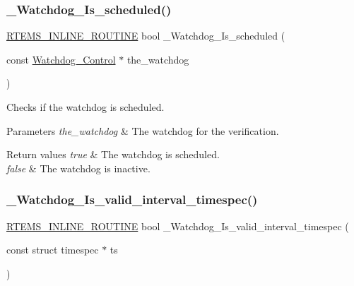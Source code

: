 \subsubsection{\texorpdfstring{\_Watchdog\_Is\_scheduled()}{\_Watchdog\_Is\_scheduled()}}
{\footnotesize\ttfamily \mbox{\hyperlink{group__RTEMSScoreBaseDefs_gac216239df231d5dbd15e3520b0b9313f}{R\+T\+E\+M\+S\+\_\+\+I\+N\+L\+I\+N\+E\+\_\+\+R\+O\+U\+T\+I\+NE}} bool \+\_\+\+Watchdog\+\_\+\+Is\+\_\+scheduled (\begin{DoxyParamCaption}\item[{const \mbox{\hyperlink{structWatchdog__Control}{Watchdog\+\_\+\+Control}} $\ast$}]{the\+\_\+watchdog }\end{DoxyParamCaption})}



Checks if the watchdog is scheduled. 


\begin{DoxyParams}{Parameters}
{\em the\+\_\+watchdog} & The watchdog for the verification.\\
\hline
\end{DoxyParams}

\begin{DoxyRetVals}{Return values}
{\em true} & The watchdog is scheduled. \\
\hline
{\em false} & The watchdog is inactive. \\
\hline
\end{DoxyRetVals}
\mbox{\label{group__RTEMSScoreWatchdog_gaf50ac3de653d343784376b28e0cedf6a}} 
\subsubsection{\texorpdfstring{\_Watchdog\_Is\_valid\_interval\_timespec()}{\_Watchdog\_Is\_valid\_interval\_timespec()}}
{\footnotesize\ttfamily \mbox{\hyperlink{group__RTEMSScoreBaseDefs_gac216239df231d5dbd15e3520b0b9313f}{R\+T\+E\+M\+S\+\_\+\+I\+N\+L\+I\+N\+E\+\_\+\+R\+O\+U\+T\+I\+NE}} bool \+\_\+\+Watchdog\+\_\+\+Is\+\_\+valid\+\_\+interval\+\_\+timespec (\begin{DoxyParamCaption}\item[{const struct timespec $\ast$}]{ts }\end{DoxyParamCaption})}



